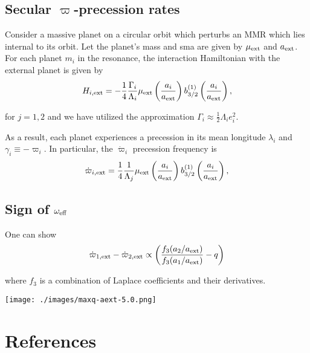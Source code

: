 \documentclass[11pt]{article}
\begin{document}
\subsection{Secular $\varpi$-precession rates}
\label{sec:org74e4749}
Consider a massive planet on a circular orbit which perturbs an MMR
which lies internal to its orbit.  Let the planet's mass and sma are
given by \(\mu_{\rm ext}\) and \(a_{\rm ext}\).  For each planet \(m_i\) in
the resonance, the interaction Hamiltonian with the external
planet is given by
\begin{equation}
  H_{i,\rm ext} = -\frac14 \frac{\Gamma_i}{\Lambda_i} \mu_{\rm ext}
  \left(\frac{a_i}{a_{\rm ext}}\right) b_{3/2}^{(1)}\left(\frac{a_i}{a_{\rm ext}}\right),
\end{equation}

\noindent
for \(j=1,2\) and we have utilized the approximation \(\Gamma_i \approx \frac12 \Lambda_i e_i^2\).

As a result, each planet experiences a precession in its mean longitude \(\lambda_i\) and
\(\gamma_i\equiv -\varpi_i\). In particular, the \(\dot\varpi_i\) precession frequency
is
\begin{equation}
\dot\varpi_{i, \rm ext} = \frac14 \frac{1}{\Lambda_j} \mu_{\rm ext} 
    \left(\frac{a_i}{a_{\rm ext}}\right) b_{3/2}^{(1)}\left(\frac{a_i}{a_{\rm ext}}\right),
\end{equation}

\subsection{Sign of \(\omega_{\rm eff}\)}
\label{sec:org57c7f63}
One can show
\begin{equation}
  \dot\varpi_{1,\rm ext}-\dot\varpi_{2,\rm ext}
\propto \left(\frac{f_3(a_2/a_{\rm ext})}{f_3(a_1/a_{\rm ext})} - q\right)
\end{equation}

where \(f_3\) is a combination of Laplace coefficients and their derivatives.
\begin{center}
\texttt{[image: ./images/maxq-aext-5.0.png]}
\end{center}

\section{References}
\label{sec:org9eddb06}


\end{document}
